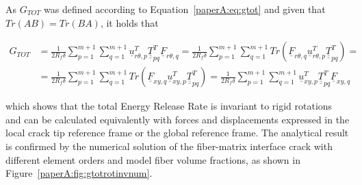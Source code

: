 As $G_{TOT}$ was defined according to Equation~\ref{paperA:eq:gtot} and given that $Tr\left(AB\right)=Tr\left(BA\right)$, it holds that

\begin{equation}\label{paperA:eq:gtotrotinv}
\begin{split}
G_{TOT} &= \frac{1}{2R_{f}\delta}\sum_{p=1}^{m+1}\sum_{q=1}^{m+1}\underline{u}_{r\theta,p}^{T}\underline{\underline{T}}_{pq}^{T}\underline{F}_{r\theta,q}=\frac{1}{2R_{f}\delta}\sum_{p=1}^{m+1}\sum_{q=1}^{m+1}Tr\left(\underline{F}_{r\theta,q}\underline{u}_{r\theta,p}^{T}\underline{\underline{T}}_{pq}^{T}\right)=\\
&=\frac{1}{2R_{f}\delta}\sum_{p=1}^{m+1}\sum_{q=1}^{m+1}Tr\left(\underline{F}_{xy,q}\underline{u}_{xy,p}^{T}\underline{\underline{T}}_{pq}^{T}\right)=\frac{1}{2R_{f}\delta}\sum_{p=1}^{m+1}\sum_{q=1}^{m+1}\underline{u}_{xy,p}^{T}\underline{\underline{T}}_{pq}^{T}\underline{F}_{xy,q}
\end{split}
\end{equation}

which shows that the total Energy Release Rate is invariant to rigid rotations and can be calculated equivalently with forces and displacements expressed in the local crack tip reference frame or the global reference frame. The analytical result is confirmed by the numerical solution of the fiber-matrix interface crack with different element orders and model fiber volume fractions, as shown in Figure~\ref{paperA:fig:gtotrotinvnum}.

